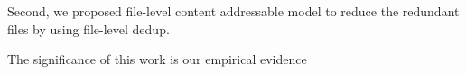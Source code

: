 Second, we proposed file-level content addressable model to reduce the redundant files by using file-level dedup.


The significance of this work is our empirical evidence 





